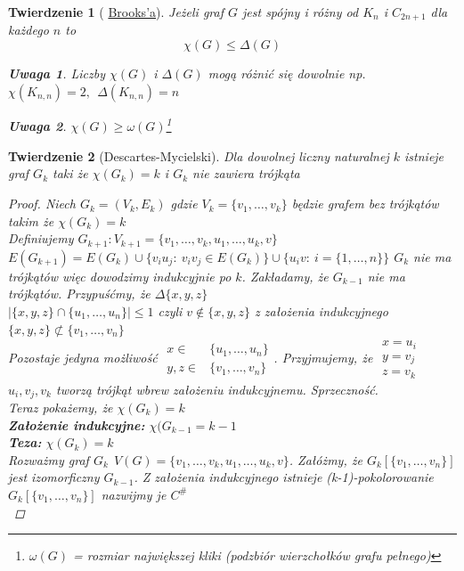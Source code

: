 \documentclass[12pt,a4paper]{article}
\newtheorem{tw}{Twierdzenie}
\theoremstyle{definition}
\newtheorem{uwaga}{Uwaga}
\begin{document}
\begin{tw}[ \href{http://en.wikipedia.org/wiki/R._Leonard_Brooks}{Brooks'a}]
Jeżeli graf $G$ jest spójny i różny od $K_n$ i $C_{2n+1}$ dla każdego $n$ to $$\chi(G) \leqslant \Delta(G)$$
\begin{uwaga}
Liczby $\chi(G)$ i $\Delta(G)$ mogą różnić się dowolnie np. $\chi(K_{n,n}) = 2,~~ \Delta(K_{n,n}) = n$
\end{uwaga}
\begin{uwaga}
$\chi(G)\geqslant\omega(G)$\footnote{$\omega(G)$ = rozmiar największej kliki (podzbiór wierzchołków grafu pełnego)}
\end{uwaga}
\end{tw}

\begin{tw}[Descartes-Mycielski]
Dla dowolnej liczny naturalnej $k$ istnieje graf $G_k$ taki że $\chi(G_k)= k$ i $G_k$ nie zawiera trójkąta
\begin{proof}
Niech $G_k = (V_k, E_k)$ gdzie $V_k = \{v_1,\dots ,v_k\}$ będzie grafem bez trójkątów takim że $\chi(G_k) = k$\\
Definiujemy $G_{k+1} : V_{k+1} = \{v_1,\dots ,v_k, u_1,\dots, u_k, v\}$\\
$E(G_{k+1}) = E(G_k) \cup \{v_iu_j: ~ v_iv_j\in E(G_k)\} \cup \{u_iv : ~ i=\{1, \dots, n\}\}$
$G_k$ nie ma trójkątów więc dowodzimy indukcyjnie po $k$. Zakładamy, że $G_{k-1}$ nie ma trójkątów. Przypuśćmy, że $\Delta\{x,y,z\}$\\
$|\{x,y,z\} \cap \{u_1,\dots, u_n\}| \leqslant 1$ czyli $v\not\in \{x,y,z\}$ z założenia indukcyjnego $\{x,y,z\} \not\subset \{v_1,\dots, v_n\}$\\
Pozostaje jedyna możliwość $\begin{matrix}x\in & \{u_1,\dots,u_n\} \\ y,z\in & \{v_1,\dots,v_n\}\end{matrix}$. Przyjmujemy, że $\begin{matrix}x = u_i \\ y = v_j \\ z = v_k\end{matrix}$\\
$u_i,v_j,v_k$ tworzą trójkąt wbrew założeniu indukcyjnemu. Sprzeczność.\\
\emph{Teraz pokażemy, że $\chi(G_k) = k$\\}
\textbf{Założenie indukcyjne:} $\chi(G_{k-1} = k-1$\\
\textbf{Teza:} $\chi(G_k) = k$\\
Rozważmy graf $G_k~~ V(G)=\{v_1,\dots ,v_k, u_1,\dots, u_k, v\}$. Załóżmy, że $G_k[\{v_1,\dots,v_n\}]$ jest izomorficzny $G_{k-1}$. Z założenia indukcyjnego istnieje (k-1)-pokolorowanie $G_k[\{v_1,\dots,v_n\}]$ nazwijmy je $C^\#$\\

\end{proof}
\end{tw}
\end{document}

